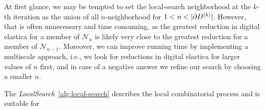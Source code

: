  At first glance, we may be tempted to set the local-search neighborhood at the $k$-th iteration as the union of all $n$-neighborhood for $1<n<|\partial \Ds^{(k)}|$. However, that is often unnecessary and time consuming, as the greatest reduction in digital elastica for a member of $\mathcal{N}_n$ is likely very close to the greatest reduction for a member of $\mathcal{N}_{n-1}$. Moreover, we can improve running time by implementing a multiscale approach, i.e., we look for reductions in digital elastica for larger values of $n$ first, and in case of a negative answer we refine our search by choosing a smaller $n$.

The \emph{LocalSearch}~\cref{alg:local-search} describes the local combinatorial process and is suitable for  

	


